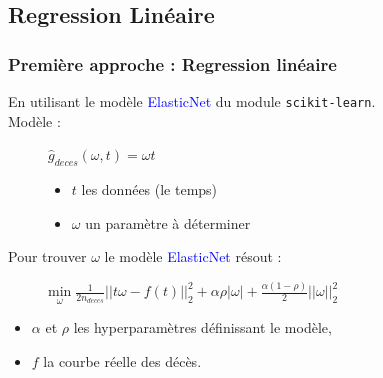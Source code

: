 \documentclass{beamer}[aspectratio = 43]
\begin{document}
\subsection{Regression Linéaire}
\begin{frame}
	\frametitle{Première approche : Regression linéaire}
	En utilisant le modèle \textcolor{blue}{ElasticNet} du module \texttt{scikit-learn}.\\
	\vspace{0.23 cm}
	Modèle :
	\begin{figure}[h]
		\begin{minipage}{0.3\textwidth}
			$\hat{g}_{deces} (\omega,t) = \omega t$
		\end{minipage}
		\begin{minipage}{0.5\textwidth}
			\begin{itemize}
				\item[] $t$ les données (le temps)
				\item[] $\omega$ un paramètre à déterminer
			\end{itemize}
		\end{minipage}
	\end{figure}
	\vspace{20pt}
	Pour trouver $\omega$ le modèle \textcolor{blue}{ElasticNet} résout :
	\begin{figure}[h]
		$\underset{\omega}{\mathrm{min}} \; \frac{1}{2n_{deces}}||t\omega- f(t)||^{2}_{2} + \alpha \rho |\omega| + \frac{\alpha (1-\rho)}{2}||\omega||^{2}_{2}$
		\\
	\end{figure}
	\begin{itemize}
		\item[]$\alpha$ et $\rho$ les hyperparamètres définissant le modèle,\\
		\item[]$f$ la courbe réelle des décès.
	\end{itemize}
\end{frame}
\end{document}
